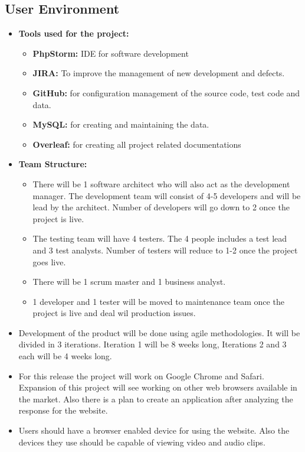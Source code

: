 \documentclass{article}
\begin{document}
\subsection{User Environment}
\begin{itemize}
    \item\textbf{Tools used for the project:}
    \begin{itemize}
        \item \textbf{PhpStorm:} IDE for software development
        \item \textbf{JIRA:} To improve the management of new development and defects.
        \item \textbf{GitHub:} for configuration management of the source code, test code and data.
        \item \textbf{MySQL:} for creating and maintaining the data.
        \item \textbf{Overleaf:} for creating all project related documentations
    \end{itemize}
    \item\textbf{Team Structure:}
    \begin{itemize}
        \item There will be 1 software architect who will also act as the development manager. The development team will consist of 4-5 developers and will be lead by the architect. Number of developers will go down to 2 once the project is live.
        \item The testing team will have 4 testers. The 4 people includes a test lead and 3 test analysts. Number of testers will reduce to 1-2 once the project goes live.
        \item There will be 1 scrum master and 1 business analyst.
        \item 1 developer and 1 tester will be moved to maintenance team once the project is live and deal wil production issues. 
    \end{itemize}
    \item Development of the product will be done using agile methodologies. It will be divided in 3 iterations. Iteration 1 will be 8 weeks long, Iterations 2 and 3 each will be 4 weeks long.
    \item For this release the project will work on Google Chrome and Safari. Expansion of this project will see working on other web browsers available in the market. Also there is a plan to create an application after analyzing the response for the website.
    \item Users should have a browser enabled device for using the website. Also the devices they use should be capable of viewing video and audio clips.

\end{itemize}
\end{document}

